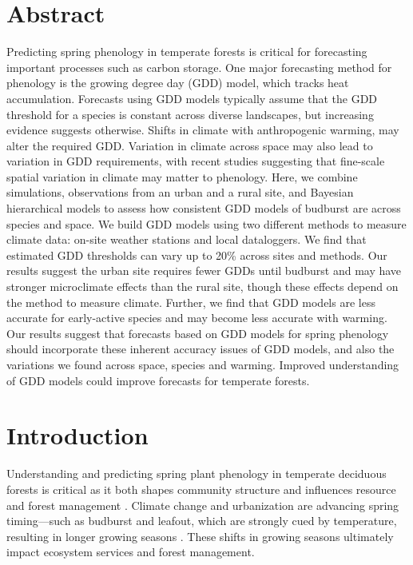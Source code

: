 \documentclass{article}\usepackage[]{graphicx}\usepackage[]{color}
\newcommand{\R}[1]{\label{#1}\linelabel{#1}}
\begin{document}
\section*{Abstract} 
Predicting spring phenology in temperate forests is critical for forecasting important processes such as carbon storage. One major forecasting method for phenology is the growing degree day (GDD) model, which tracks heat accumulation. Forecasts using GDD models typically assume that the GDD threshold for a species is constant across diverse landscapes, but increasing evidence suggests otherwise. Shifts in climate with anthropogenic warming, may alter the required GDD. Variation in climate across space may also lead to variation in GDD requirements, with recent studies suggesting that fine-scale spatial variation in climate may matter to phenology. Here, we combine simulations, observations from an urban and a rural site, and Bayesian hierarchical models to assess how consistent GDD models of budburst are across species and space. We build GDD models using two different methods to measure climate data: on-site weather stations and local dataloggers. We find that estimated GDD thresholds can vary up to 20\% across sites and methods. Our results suggest the urban site requires fewer GDDs until budburst and may have stronger microclimate effects than the rural site, though these effects depend on the method to measure climate. Further, we find that GDD models are less accurate for early-active species and may become less accurate with warming. Our results suggest that forecasts based on GDD models for spring phenology should incorporate these inherent accuracy issues of GDD models, and also the variations we found across space, species and warming. Improved understanding of GDD models could improve forecasts for temperate forests.  

\section{Introduction}

\R{Z1ecosys}Understanding and predicting spring plant phenology in temperate deciduous forests is critical as it both shapes community structure and influences resource and forest management \citep{Morellato2016,Silvestro2019}. Climate change and urbanization are advancing spring timing---such as budburst and leafout, which are strongly cued by temperature, resulting in longer growing seasons \citep{Chuine2001}. These shifts in growing seasons ultimately impact ecosystem services and forest management.\R{Z1ecosysend}
 
\end{document}
